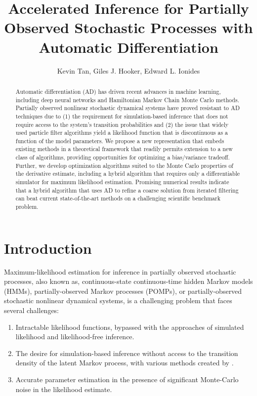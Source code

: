 \documentclass{article}
\title{Accelerated Inference for Partially Observed Stochastic Processes with Automatic Differentiation}
\author{Kevin Tan, Giles J. Hooker, Edward L. Ionides}
\date{}
\begin{document}
\maketitle
\begin{abstract}
    
Automatic differentiation (AD) has driven recent advances in machine learning, including deep neural networks and Hamiltonian Markov Chain Monte Carlo methods. Partially observed nonlinear stochastic dynamical systems have proved resistant to AD techniques due to (1) the requirement for simulation-based inference that does not require access to the system's transition probabilities and (2) the issue that widely used particle filter algorithms yield a likelihood function that is discontinuous as a function of the model parameters. We propose a new representation that embeds existing methods in a theoretical framework that readily permits extension to a new class of algorithms, providing opportunities for optimizing a bias/variance tradeoff. Further, we develop optimization algorithms suited to the Monte Carlo properties of the derivative estimate, including a hybrid algorithm that requires only a differentiable simulator for maximum likelihood estimation. Promising numerical results indicate that a hybrid algorithm that uses AD to refine a coarse solution from iterated filtering can beat current state-of-the-art methods on a challenging scientific benchmark problem.
\end{abstract}

\section{Introduction}

Maximum-likelihood estimation for inference in partially observed stochastic processes, also known as, continuous-state continuous-time hidden Markov models (HMMs), partially-observed Markov processes (POMPs), or partially-observed stochastic nonlinear dynamical systems, is a challenging problem that faces several challenges: 
\begin{enumerate}
    \item Intractable likelihood functions, bypassed with the approaches of simulated likelihood and likelihood-free inference. 
    \item The desire for simulation-based inference without access to the transition density of the latent Markov process, with various methods created by \cite{welch2009abc, wood2010sl, doucet2010pmcmc, ionides08, ionides15}. 
    \item Accurate parameter estimation in the presence of significant Monte-Carlo noise in the likelihood estimate.
\end{enumerate}
\end{document}
